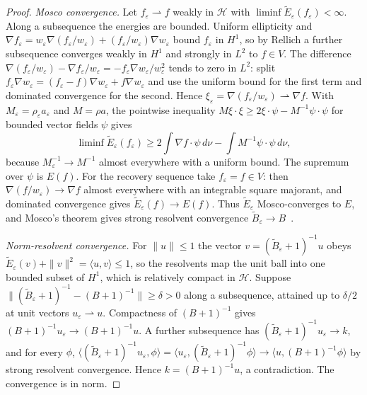 \documentclass[11pt]{article}
\begin{document}
\begin{proof}
\emph{Mosco convergence.} Let $f_\varepsilon\rightharpoonup f$ weakly in
$\mathcal H$ with $\liminf\widetilde E_\varepsilon(f_\varepsilon)<\infty$.
Along a subsequence the energies are bounded. Uniform ellipticity and
$\nabla f_\varepsilon=w_\varepsilon\nabla(f_\varepsilon/w_\varepsilon)
+(f_\varepsilon/w_\varepsilon)\nabla w_\varepsilon$ bound $f_\varepsilon$ in
$H^1$, so by Rellich a further subsequence converges weakly in $H^1$ and
strongly in $L^2$ to $f\in V$. The difference
$\nabla(f_\varepsilon/w_\varepsilon)-\nabla f_\varepsilon/w_\varepsilon
=-f_\varepsilon\nabla w_\varepsilon/w_\varepsilon^2$ tends to zero in $L^2$:
split $f_\varepsilon\nabla w_\varepsilon=(f_\varepsilon-f)\nabla w_\varepsilon
+f\nabla w_\varepsilon$ and use the uniform bound for the first term and
dominated convergence for the second. Hence
$\xi_\varepsilon=\nabla(f_\varepsilon/w_\varepsilon)\rightharpoonup\nabla f$.
With $M_\varepsilon=\rho_\varepsilon a_\varepsilon$ and $M=\rho a$, the
pointwise inequality
$M\xi\cdot\xi\geq2\xi\cdot\psi-M^{-1}\psi\cdot\psi$ for bounded vector
fields $\psi$ gives
\[
 \liminf\widetilde E_\varepsilon(f_\varepsilon)
 \geq2\int\nabla f\cdot\psi\,d\nu-\int M^{-1}\psi\cdot\psi\,d\nu,
\]
because $M_\varepsilon^{-1}\to M^{-1}$ almost everywhere with a uniform
bound. The supremum over $\psi$ is $E(f)$. For the recovery sequence take
$f_\varepsilon=f\in V$: then
$\nabla(f/w_\varepsilon)\to\nabla f$ almost everywhere with an integrable
square majorant, and dominated convergence gives
$\widetilde E_\varepsilon(f)\to E(f)$. Thus $\widetilde E_\varepsilon$
Mosco-converges to $E$, and Mosco's theorem gives strong resolvent
convergence $\widetilde B_\varepsilon\to B$~\cite{mosco1994}.

\emph{Norm-resolvent convergence.} For $\|u\|\leq1$ the vector
$v=(\widetilde B_\varepsilon+1)^{-1}u$ obeys
$\widetilde E_\varepsilon(v)+\|v\|^2=\langle u,v\rangle\leq1$, so the
resolvents map the unit ball into one bounded subset of $H^1$, which is
relatively compact in $\mathcal H$. Suppose
$\|(\widetilde B_\varepsilon+1)^{-1}-(B+1)^{-1}\|\geq\delta>0$ along a
subsequence, attained up to $\delta/2$ at unit vectors
$u_\varepsilon\rightharpoonup u$. Compactness of $(B+1)^{-1}$ gives
$(B+1)^{-1}u_\varepsilon\to(B+1)^{-1}u$. A further subsequence has
$(\widetilde B_\varepsilon+1)^{-1}u_\varepsilon\to k$, and for every $\phi$,
$\langle(\widetilde B_\varepsilon+1)^{-1}u_\varepsilon,\phi\rangle
=\langle u_\varepsilon,(\widetilde B_\varepsilon+1)^{-1}\phi\rangle
\to\langle u,(B+1)^{-1}\phi\rangle$ by strong resolvent convergence. Hence
$k=(B+1)^{-1}u$, a contradiction. The convergence is in norm.


\end{proof}
\end{document}
